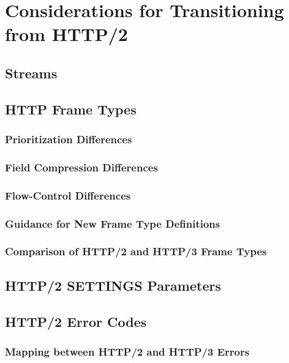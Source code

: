 \documentclass{article}
\begin{document}
\section{Considerations for Transitioning from HTTP/2}

\subsection{Streams}

\subsection{HTTP Frame Types}

\subsubsection{Prioritization Differences}

\subsubsection{Field Compression Differences}

\subsubsection{Flow-Control Differences}

\subsubsection{Guidance for New Frame Type Definitions}

\subsubsection{Comparison of HTTP/2 and HTTP/3 Frame Types}

\subsection{HTTP/2 SETTINGS Parameters}

\subsection{HTTP/2 Error Codes}

\subsubsection{Mapping between HTTP/2 and HTTP/3 Errors}
\end{document}
